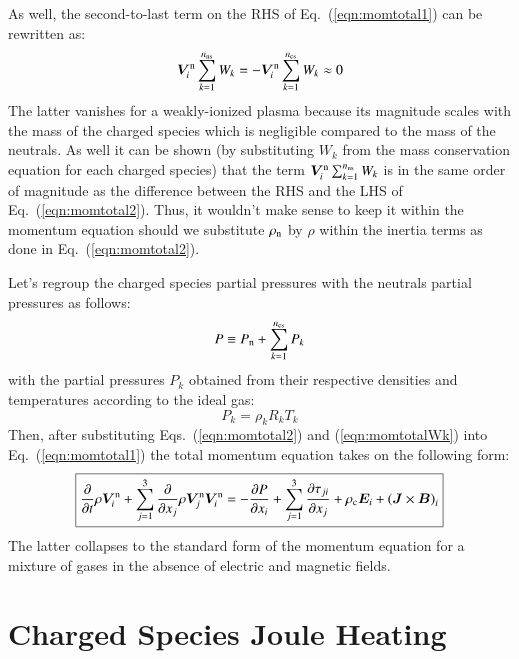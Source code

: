 \documentclass{warpdoc}
\newcommand\frameeqn[1]{\fbox{$\displaystyle #1$}}
\newcommand{\nns}{{n_{\rm ns}}}
\newcommand{\ncs}{{n_{\rm cs}}}
\renewcommand{\vec}[1]{\bm{#1}}
\begin{document}
%    
As well, the second-to-last term on the RHS of Eq.\ (\ref{eqn:momtotal1}) can be rewritten as:
%
\begin{equation}
\vec{V}_i^{\rm n} \sum_{k=1}^\nns  W_k
=
-\vec{V}_i^{\rm n} \sum_{k=1}^\ncs  W_k \approx 0
\label{eqn:momtotalWk}
\end{equation}
%
The latter vanishes for a weakly-ionized plasma because its magnitude scales with the mass of the charged species which is negligible compared to the mass of the neutrals. As well it can be shown (by substituting $W_k$ from the mass conservation equation for each charged species) that the term $\vec{V}_i^{\rm n} \sum_{k=1}^\nns  W_k$ is in the same order of magnitude as the difference between the RHS and the LHS of Eq.\ (\ref{eqn:momtotal2}). Thus, it wouldn't make sense to keep it within the momentum equation should we substitute $\rho_{\rm n}$ by $\rho$ within the inertia terms as done in Eq.\ (\ref{eqn:momtotal2}).  

Let's regroup the charged species partial pressures with the neutrals partial pressures as follows:
%
\begin{equation}
P\equiv P_{\rm n}+\sum_{k=1}^\ncs P_k  
\end{equation}
%
with the partial pressures $P_k$ obtained from their respective densities and temperatures according to the ideal gas:
%
\begin{equation}
 P_k=\rho_k R_k T_k
\end{equation}
%
Then, after substituting Eqs.\ (\ref{eqn:momtotal2}) and (\ref{eqn:momtotalWk}) into Eq.\ (\ref{eqn:momtotal1}) the total momentum equation takes on the following form:
%
\begin{equation}
\frameeqn{
   \frac{\partial  }{\partial t}\rho \vec{V}_i^{\rm n}
  + \sum_{j=1}^3  \frac{\partial }{\partial x_j}\rho \vec{V}_j^{\rm n} \vec{V}_i^{\rm n}
=
-\frac{\partial P }{\partial x_i}  
+ \sum_{j=1}^3 \frac{\partial \tau_{ji}}{\partial x_j}
+ \rho_{\rm c} \vec{E}_i +\left(\vec{J} \times \vec{B}\right)_i
}
\label{eqn:momtotal3}
\end{equation}
%
The latter collapses to the standard form of the momentum equation for a mixture of gases in the absence of electric and magnetic fields. 





\section{Charged Species Joule Heating}
\end{document}
